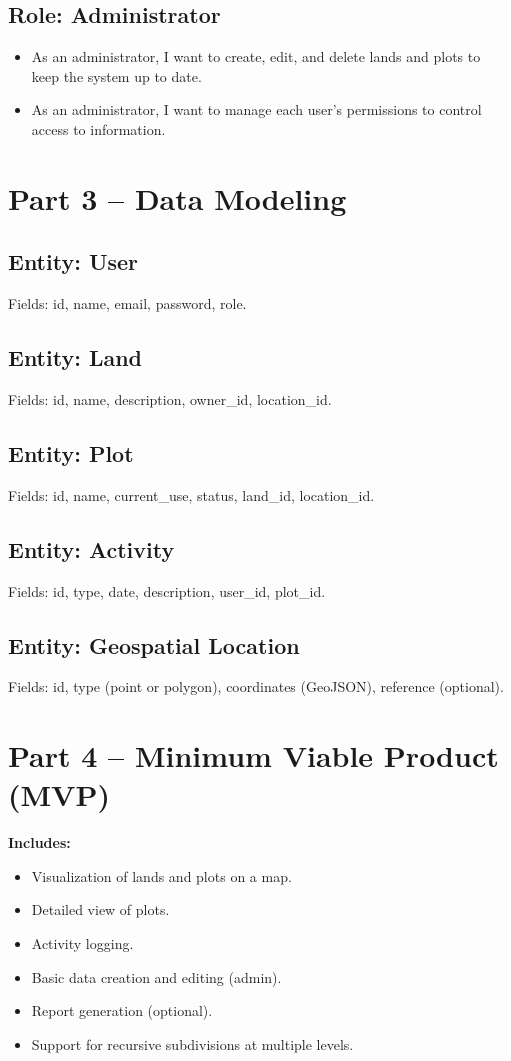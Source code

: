 \documentclass[12pt]{article}
\begin{document}
\subsection*{Role: Administrator}
\begin{itemize}[label=--]
  \item As an administrator, I want to create, edit, and delete lands and plots to keep the system up to date.
  \item As an administrator, I want to manage each user's permissions to control access to information.
\end{itemize}

\section{Part 3 – Data Modeling}

\subsection*{Entity: User}
Fields: id, name, email, password, role.

\subsection*{Entity: Land}
Fields: id, name, description, owner\_id, location\_id.

\subsection*{Entity: Plot}
Fields: id, name, current\_use, status, land\_id, location\_id.

\subsection*{Entity: Activity}
Fields: id, type, date, description, user\_id, plot\_id.

\subsection*{Entity: Geospatial Location}
Fields: id, type (point or polygon), coordinates (GeoJSON), reference (optional).

\section{Part 4 – Minimum Viable Product (MVP)}

\textbf{Includes:}
\begin{itemize}
  \item Visualization of lands and plots on a map.
  \item Detailed view of plots.
  \item Activity logging.
  \item Basic data creation and editing (admin).
  \item Report generation (optional).
  \item Support for recursive subdivisions at multiple levels.
\end{itemize}
\end{document}
